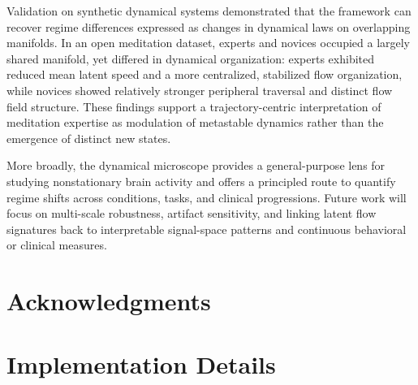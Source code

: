 \documentclass[5p,twocolumn,authoryear]{elsarticle}
\begin{document}
Validation on synthetic dynamical systems demonstrated that the framework can recover regime differences expressed as changes in dynamical laws on overlapping manifolds. In an open meditation dataset, experts and novices occupied a largely shared manifold, yet differed in dynamical organization: experts exhibited reduced mean latent speed and a more centralized, stabilized flow organization, while novices showed relatively stronger peripheral traversal and distinct flow field structure. These findings support a trajectory-centric interpretation of meditation expertise as modulation of metastable dynamics rather than the emergence of distinct new states.

More broadly, the dynamical microscope provides a general-purpose lens for studying nonstationary brain activity and offers a principled route to quantify regime shifts across conditions, tasks, and clinical progressions. Future work will focus on multi-scale robustness, artifact sensitivity, and linking latent flow signatures back to interpretable signal-space patterns and continuous behavioral or clinical measures.

\section*{Acknowledgments}

\appendix
\section{Implementation Details}
\label{app:implementation}
\end{document}

